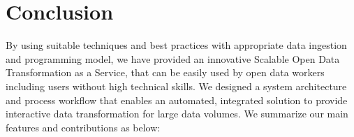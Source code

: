 
\chapter{Conclusion} %
\label{Chapter6} %



By using suitable techniques and best practices with appropriate data ingestion and programming model, we have provided an innovative Scalable Open Data Transformation as a Service, that can be easily used by open data workers including users without high technical skills. We designed a system architecture and process workflow that enables an automated, integrated solution to provide interactive data transformation for large data volumes. We summarize our main features and contributions as below:
